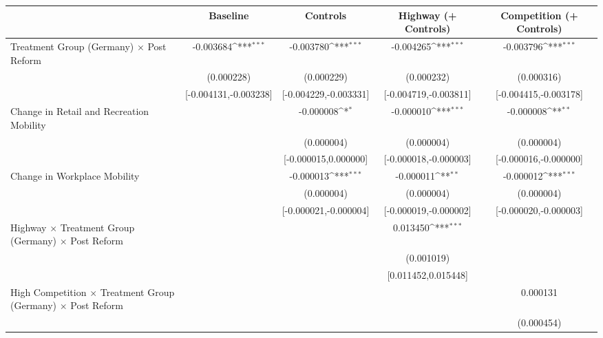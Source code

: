 {
\def\sym#1{\ifmmode^{#1}\else\(^{#1}\)\fi}
\begin{tabular}{l*{4}{c}}
\toprule
                    &\multicolumn{1}{c}{Baseline}&\multicolumn{1}{c}{Controls}&\multicolumn{1}{c}{Highway (+ Controls)}&\multicolumn{1}{c}{Competition (+ Controls)}\\
\midrule
Treatment Group (Germany) $\times$ Post Reform&   -0.003684\sym{***}&   -0.003780\sym{***}&   -0.004265\sym{***}&   -0.003796\sym{***}\\
                    &  (0.000228)         &  (0.000229)         &  (0.000232)         &  (0.000316)         \\
                    &[-0.004131,-0.003238]         &[-0.004229,-0.003331]         &[-0.004719,-0.003811]         &[-0.004415,-0.003178]         \\
Change in Retail and Recreation Mobility&                     &   -0.000008\sym{*}  &   -0.000010\sym{***}&   -0.000008\sym{**} \\
                    &                     &  (0.000004)         &  (0.000004)         &  (0.000004)         \\
                    &                     &[-0.000015,0.000000]         &[-0.000018,-0.000003]         &[-0.000016,-0.000000]         \\
Change in Workplace Mobility&                     &   -0.000013\sym{***}&   -0.000011\sym{**} &   -0.000012\sym{***}\\
                    &                     &  (0.000004)         &  (0.000004)         &  (0.000004)         \\
                    &                     &[-0.000021,-0.000004]         &[-0.000019,-0.000002]         &[-0.000020,-0.000003]         \\
Highway $\times$ Treatment Group (Germany) $\times$ Post Reform&                     &                     &    0.013450\sym{***}&                     \\
                    &                     &                     &  (0.001019)         &                     \\
                    &                     &                     &[0.011452,0.015448]         &                     \\
High Competition $\times$ Treatment Group (Germany) $\times$ Post Reform&                     &                     &                     &    0.000131         \\
                    &                     &                     &                     &  (0.000454)         \\

\end{tabular}}
